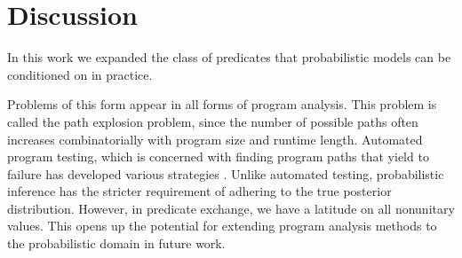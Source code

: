 \section{Discussion}
In this work we expanded the class of predicates that probabilistic models can be conditioned on in practice.

Problems of this form appear in all forms of program analysis.
This problem is called the path explosion problem, since the number of possible paths often increases combinatorially with program size and runtime length.
Automated program testing, which is concerned with finding program paths that yield to failure has developed various strategies \cite{cadar2008exe, sen2005cute}.
Unlike automated testing, probabilistic inference has the stricter requirement of adhering to the true posterior distribution.
However, in predicate exchange, we have a latitude on all nonunitary values.
This opens up the potential for extending program analysis methods to the probabilistic domain in future work.








